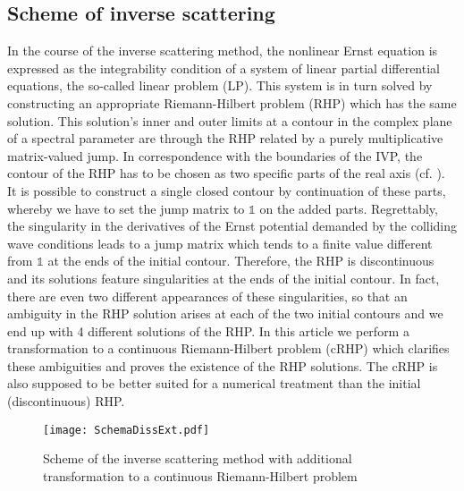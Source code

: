 \documentclass[12pt]{iopart}
\begin{document}
\subsection{Scheme of inverse scattering}

In the course of the inverse scattering method, the nonlinear Ernst equation is expressed as the integrability condition of a system of linear partial differential equations, the so-called linear problem (LP). This system is in turn solved by constructing an appropriate Riemann-Hilbert problem (RHP) which has the same solution. This solution's inner and outer limits at a contour in the complex plane of a spectral parameter are through the RHP related by a purely multiplicative matrix-valued jump. In correspondence with the boundaries of the IVP, the contour of the RHP has to be chosen as two specific parts of the real axis (cf. ). It is possible to construct a single closed contour by continuation of these parts, whereby we have to set the jump matrix to $\mathbb{1}$ on the added parts. Regrettably, the singularity in the derivatives of the Ernst potential demanded by the colliding wave conditions  leads to a jump matrix which tends to a finite value different from $\mathbb{1}$ at the ends of the  initial contour. Therefore, the RHP is discontinuous and its solutions feature singularities at the ends of the initial contour. In fact, there are even two different appearances of these singularities, so that an ambiguity in the RHP solution arises at each of the two initial contours and we end up with 4 different solutions of the RHP.
 In this article we perform a transformation to a continuous Riemann-Hilbert problem (cRHP) which clarifies these ambiguities and proves the existence of the RHP solutions. The cRHP is also supposed to be better suited for a numerical treatment  than the initial (discontinuous) RHP.

\begin{figure}[ht]
\centering
\texttt{[image: SchemaDissExt.pdf]}
\caption{Scheme of the inverse scattering method with additional transformation to a continuous Riemann-Hilbert problem}
\label{Lösungsschema}
\end{figure} 
\end{document}
